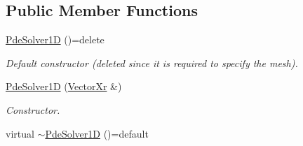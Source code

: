 \subsection*{Public Member Functions}
\begin{DoxyCompactItemize}
\item 
\hypertarget{classPdeSolver1D_a9e578d43e38517bade5c0911b7906e73}{\hyperlink{classPdeSolver1D_a9e578d43e38517bade5c0911b7906e73}{Pde\-Solver1\-D} ()=delete}\label{classPdeSolver1D_a9e578d43e38517bade5c0911b7906e73}

\begin{DoxyCompactList}\small\item\em Default constructor (deleted since it is required to specify the mesh). \end{DoxyCompactList}\item 
\hyperlink{classPdeSolver1D_a9b9afdddc0715af15ffcffa1a29a8c0d}{Pde\-Solver1\-D} (\hyperlink{typedefs_8h_aae6cee78ed9cd8f234ed8cb48682548a}{Vector\-Xr} \&)
\begin{DoxyCompactList}\small\item\em Constructor. \end{DoxyCompactList}\item 
\hypertarget{classPdeSolver1D_ae52bcba084b9cc8daa575e3f06d9271a}{virtual \hyperlink{classPdeSolver1D_ae52bcba084b9cc8daa575e3f06d9271a}{$\sim$\-Pde\-Solver1\-D} ()=default}\label{classPdeSolver1D_ae52bcba084b9cc8daa575e3f06d9271a}


\end{DoxyCompactItemize}
